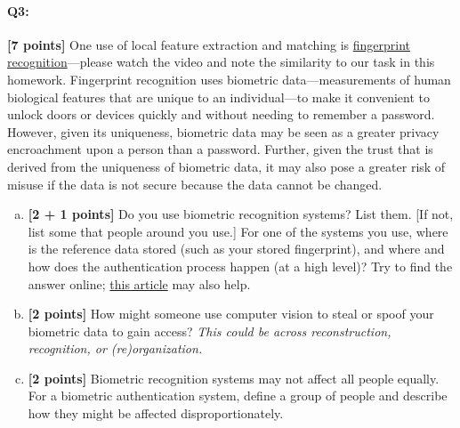 






\pagebreak
\paragraph{Q3:} \textbf{[7 points]} One use of local feature extraction and matching is \href{https://www.youtube.com/watch?v=xD88Qs_DZp4}{fingerprint recognition}---please watch the video and note the similarity to our task in this homework. Fingerprint recognition uses biometric data---measurements of human biological features that are unique to an individual---to make it convenient to unlock doors or devices quickly and without needing to remember a password. However, given its uniqueness, biometric data may be seen as a greater privacy encroachment upon a person than a password. Further, given the trust that is derived from the uniqueness of biometric data, it may also pose a greater risk of misuse if the data is not secure because the data cannot be changed.

\begin{enumerate}[(a)]
    \item \textbf{[2 + 1 points]}
Do you use biometric recognition systems? List them. [If not, list some that people around you use.]
For one of the systems you use, where is the reference data stored (such as your stored fingerprint), and where and how does the authentication process happen (at a high level)? 
Try to find the answer online; \href{https://ievoreader.com/how-biometric-data-is-stored/}{this article} may also help.

\item
\textbf{[2 points]}
How might someone use computer vision to steal or spoof your biometric data to gain access? \emph{This could be across reconstruction, recognition, or (re)organization.}

\item
\textbf{[2 points]}
Biometric recognition systems may not affect all people equally. For a biometric authentication system, define a group of people and describe how they might be affected disproportionately.
\end{enumerate}


